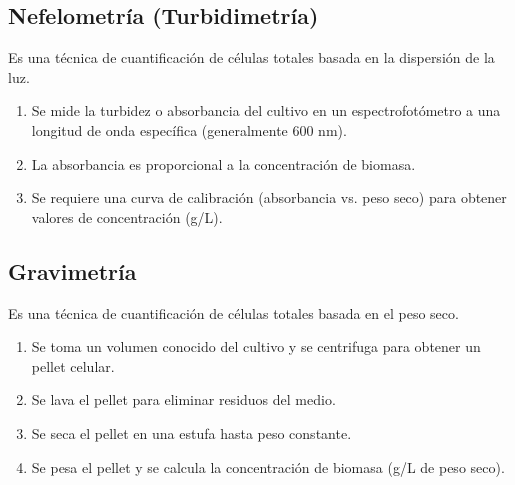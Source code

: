 \subsection{Nefelometría (Turbidimetría)}
Es una técnica de cuantificación de células totales basada en la dispersión de la luz.
\begin{enumerate}
    \item Se mide la turbidez o absorbancia del cultivo en un espectrofotómetro a una longitud de onda específica (generalmente 600 nm).
    \item La absorbancia es proporcional a la concentración de biomasa.
    \item Se requiere una curva de calibración (absorbancia vs. peso seco) para obtener valores de concentración (g/L).
\end{enumerate}

\subsection{Gravimetría}
Es una técnica de cuantificación de células totales basada en el peso seco.
\begin{enumerate}
    \item Se toma un volumen conocido del cultivo y se centrifuga para obtener un pellet celular.
    \item Se lava el pellet para eliminar residuos del medio.
    \item Se seca el pellet en una estufa hasta peso constante.
    \item Se pesa el pellet y se calcula la concentración de biomasa (g/L de peso seco).
\end{enumerate}
